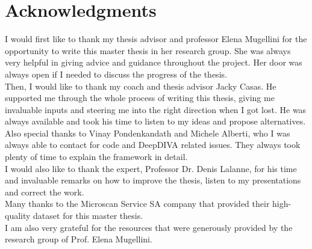 \documentclass[11pt,a4paper,twoside,hidelinks,openright]{rvsmaster}
\makeatletter
\def\cleardoublepage{\clearpage\if@twoside \ifodd\c@page\else
	\hbox{}
	\thispagestyle{empty}
	\newpage
\fi\fi}
\makeatother
\begin{document}
\tableofcontents{}
\listoffigures{}
\listoftables{}



\chapter*{Acknowledgments}

I would first like to thank my thesis advisor and professor Elena Mugellini for the opportunity to write this master thesis in her research group. She was always very helpful in giving advice and guidance throughout the project. Her door was always open if I needed to discuss the progress of the thesis.\\


Then, I would like to thank my coach and thesis advisor Jacky Casas. He supported me through the whole process of writing this thesis, giving me invaluable inputs and steering me into the right direction when I got lost. He was always available and took his time to listen to my ideas and propose alternatives.\\


Also special thanks to Vinay Pondenkandath and Michele Alberti, who I was always able to contact for code and DeepDIVA related issues. They always took plenty of time to explain the framework in detail.\\


I would also like to thank the expert, Professor Dr. Denis Lalanne, for his time and invaluable remarks on how to improve the thesis, listen to my presentations and correct the work. \\


Many thanks to the Microscan Service SA company that provided their high-quality dataset for this master thesis.\\


I am also very grateful for the resources that were generously provided by the research group of Prof. Elena Mugellini.

\cleardoublepage
\setcounter{page}{1}	%













\end{document}
